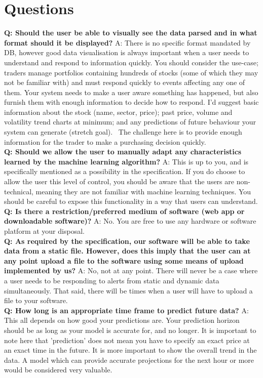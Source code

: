 \documentclass[11pt, oneside, a4paper]{article}
\begin{document}
\newpage
\appendix
\section{Questions}
\textbf{Q: Should the user be able to visually see the data parsed and in what format should it be displayed?}
A: There is no specific format mandated by DB, however good data visualisation is always important when a user needs to
understand and respond to information quickly.
You should consider the use-case; traders manage portfolios containing hundreds of stocks (some of which they may not be
familiar with) and must respond quickly to events affecting any one of them. Your system needs to make a user aware something
has happened, but also furnish them with enough information to decide how to respond. I'd suggest basic information about the
stock (name, sector, price); past price, volume and volatility trend charts at minimum; and any predictions of future behaviour
your system can generate (stretch goal).  The challenge here is to provide enough information for the trader to make a purchasing
decision quickly. \\
\textbf{Q: Should we allow the user to manually adapt any characteristics learned by the machine learning algorithm?}
A: This is up to you, and is specifically mentioned as a possibility in the specification. If you do choose to allow the user
this level of control, you should be aware that the users are non-technical, meaning they are not familiar with machine learning
techniques. You should be careful to expose this functionality in a way that users can understand. \\
\textbf{Q: Is there a restriction/preferred medium of software (web app or downloadable software)?}
A: No. You are free to use any hardware or software platform at your disposal. \\
\textbf{Q: As required by the specification, our software will be able to take data from a static file. However, does this imply
that the user can at any point upload a file to the software using some means of upload implemented by us?}
A: No, not at any point. There will never be a case where a user needs to be responding to alerts from static and dynamic data
simultaneously. That said, there will be times when a user will have to upload a file to your software. \\
\textbf{Q: How long is an appropriate time frame to predict future data?}
A: This all depends on how good your predictions are. Your prediction horizon should be as long as your model is accurate for,
and no longer. It is important to note here that 'prediction' does not mean you have to specify an exact price at an exact time
in the future. It is more important to show the overall trend in the data. A model which can provide accurate projections for the
next hour or more would be considered very valuable.
\end{document}
